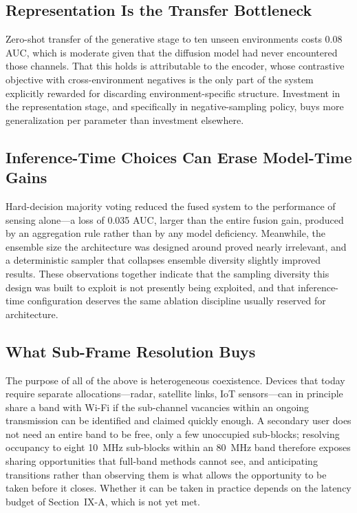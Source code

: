\documentclass[lettersize,journal]{IEEEtran}
\begin{document}
\subsection{Representation Is the Transfer Bottleneck}
Zero-shot transfer of the generative stage to ten unseen environments
costs 0.08 AUC, which is moderate given that the diffusion model had
never encountered those channels. That this holds is attributable to the
encoder, whose contrastive objective with cross-environment negatives is
the only part of the system explicitly rewarded for discarding
environment-specific structure. Investment in the representation stage,
and specifically in negative-sampling policy, buys more generalization
per parameter than investment elsewhere.

\subsection{Inference-Time Choices Can Erase Model-Time Gains}
Hard-decision majority voting reduced the fused system to the
performance of sensing alone---a loss of 0.035 AUC, larger than the
entire fusion gain, produced by an aggregation rule rather than by any
model deficiency. Meanwhile, the ensemble size the architecture was
designed around proved nearly irrelevant, and a deterministic sampler
that collapses ensemble diversity slightly improved results. These
observations together indicate that the sampling diversity this design
was built to exploit is not presently being exploited, and that
inference-time configuration deserves the same ablation discipline
usually reserved for architecture.

\subsection{What Sub-Frame Resolution Buys}
The purpose of all of the above is heterogeneous coexistence. Devices that
today require separate allocations---radar, satellite links, IoT sensors---can
in principle share a band with Wi-Fi if the sub-channel vacancies within an
ongoing transmission can be identified and claimed quickly enough. A secondary
user does not need an entire band to be free, only a few unoccupied
sub-blocks; resolving occupancy to eight 10~MHz sub-blocks within an 80~MHz
band therefore exposes sharing opportunities that full-band methods cannot see,
and anticipating transitions rather than observing them is what allows the
opportunity to be taken before it closes. Whether it can be taken in practice
depends on the latency budget of Section~IX-A, which is not yet met.
\end{document}
